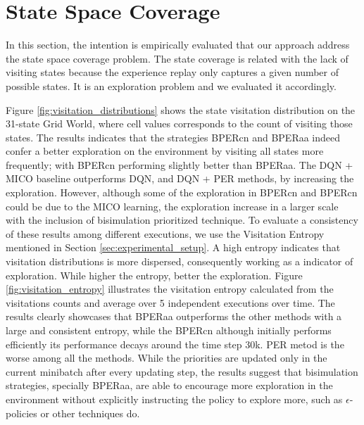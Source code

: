 \section{State Space Coverage}

In this section, the intention is empirically evaluated that our approach address the state space coverage problem. The state coverage is related with the lack of visiting states because the experience replay only captures a given number of possible states. It is an exploration problem and we evaluated it accordingly.

Figure \ref{fig:visitation_distributions} shows the state visitation distribution on the 31-state Grid World, where cell values corresponds to the count of visiting those states. The results indicates that the strategies BPERcn and BPERaa indeed confer a better exploration on the environment by visiting all states more frequently; with BPERcn performing slightly better than BPERaa. The DQN + MICO baseline outperforms DQN, and DQN + PER methods, by increasing the exploration. However, although some of the exploration in BPERcn and BPERcn could be due to the MICO learning, the exploration increase in a larger scale with the inclusion of bisimulation prioritized technique. To evaluate a consistency of these results among different executions, we use the Visitation Entropy mentioned in Section \ref{sec:experimental_setup}. A high entropy indicates that visitation distributions is more dispersed, consequently working as a indicator of exploration. While higher the entropy, better the exploration. Figure \ref{fig:visitation_entropy} illustrates the visitation entropy calculated from the visitations counts and average over 5 independent executions over time. The results clearly showcases that BPERaa outperforms the other methods with a large and consistent entropy, while the BPERcn although initially performs efficiently its performance decays around the time step 30k. PER metod is the worse among all the methods. While the priorities are updated only in the current minibatch after every updating step, the results suggest that bisimulation strategies, specially BPERaa, are able to encourage more exploration in the environment without explicitly instructing the policy to explore more, such as $\epsilon$-policies or other techniques do.

